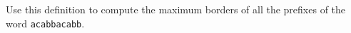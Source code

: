 Use this definition to compute the maximum borders of all the prefixes
of the word \texttt{acabbacabb}.
